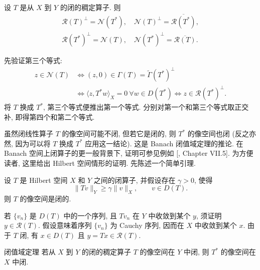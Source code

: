 \begin{Theorem}\label{thm:adjoint-kernel-range-orthogonality}
设 $T$ 是从 $X$ 到 $Y$ 的闭的稠定算子. 则
\[
\begin{gathered}
\mathcal R(T)^\perp=\mathcal N(T^*),\quad\mathcal N(T)^\perp=\overline{\mathcal R(T^*)},\\
\mathcal R(T^*)^\perp=\mathcal N(T),\quad\mathcal N(T^*)^\perp=\overline{\mathcal R(T)}.
\end{gathered}
\]
\end{Theorem}

\begin{Proof}
先验证第三个等式:
\[
\begin{aligned}
z\in\mathcal N(T)&\iff(z,0)\in\Gamma(T)=\widetilde\Gamma(T^*)^\perp\\
&\iff\langle z,T^*w\rangle_X=0\ \forall w\in D(T^*)\iff z\in\mathcal R(T^*)^\perp.
\end{aligned}
\]
将 $T$ 换成 $T^*$, 第三个等式便推出第一个等式. 分别对第一个和第三个等式取正交补, 即得第四个和第二个等式.
\end{Proof}

虽然闭线性算子 $T$ 的像空间可能不闭, 但若它是闭的, 则 $T^*$ 的像空间也闭 (反之亦然, 因为可以将 $T$ 换成 $T^*$ 应用这一结论). 这是 Banach 闭值域定理的推论. 在 Banach 空间上闭算子的更一般背景下, 证明可参见例如 [, Chapter VII.5]. 为方便读者, 这里给出 Hilbert 空间情形的证明. 先陈述一个简单引理.

\begin{Lemma}\label{lem:operator-lower-bound-closed-range}
设 $T$ 是 Hilbert 空间 $X$ 和 $Y$ 之间的闭算子, 并假设存在 $\gamma>0$, 使得
\[
\|Tv\|_Y\geq\gamma\|v\|_X,\qquad v\in D(T).
\]
则 $T$ 的像空间是闭的.
\end{Lemma}

\begin{Proof}
若 $\{v_n\}$ 是 $D(T)$ 中的一个序列, 且 $Tv_n$ 在 $Y$ 中收敛到某个 $y$, 须证明 $y\in\mathcal R(T)$. 假设意味着序列 $\{v_n\}$ 为 Cauchy 序列, 因而在 $X$ 中收敛到某个 $x$. 由于 $T$ 闭, 有 $x\in D(T)$ 且 $y=Tx\in\mathcal R(T)$.
\end{Proof}

\begin{Theorem}{{闭值域定理}}\label{thm:closed-range}
若从 $X$ 到 $Y$ 的闭的稠定算子 $T$ 的像空间在 $Y$ 中闭, 则 $T^*$ 的像空间在 $X$ 中闭.
\end{Theorem}

